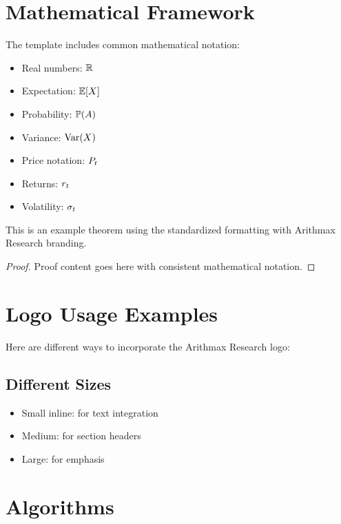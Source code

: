 \documentclass[twocolumn,ieee]{arithmaxresearch}
\begin{document}
\section{Mathematical Framework}

The template includes common mathematical notation:
\begin{itemize}
    \item Real numbers: $\mathbb{R}$
    \item Expectation: $\mathbb{E}[X]$
    \item Probability: $\mathbb{P}(A)$
    \item Variance: $\text{Var}(X)$
    \item Price notation: $P_{t}$
    \item Returns: $r_{t}$
    \item Volatility: $\sigma_{t}$
\end{itemize}

\begin{theorem}
This is an example theorem using the standardized formatting with Arithmax Research branding.
\end{theorem}

\begin{proof}
Proof content goes here with consistent mathematical notation.
\end{proof}

\section{Logo Usage Examples}

Here are different ways to incorporate the Arithmax Research logo:

\subsection{Different Sizes}
\begin{itemize}
    \item Small inline: \arithmaxinlinelogo[0.5cm] for text integration
    \item Medium: \arithmaxlogoscaled[2cm] for section headers
    \item Large: \arithmaxtitlelogo[3cm] for emphasis
\end{itemize}

\section{Algorithms}
\end{document}
